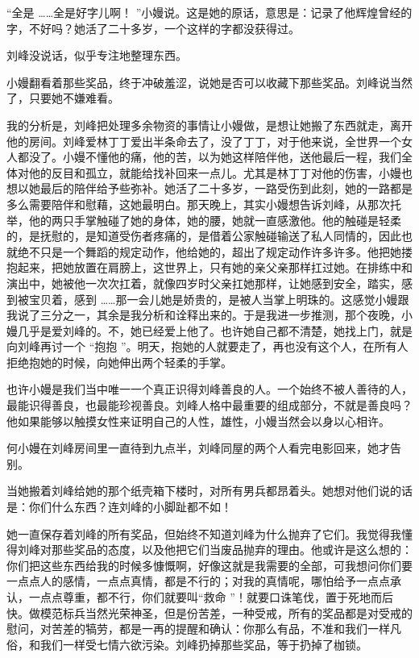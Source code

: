 \documentclass[12pt,twoside,openany]{book}
\begin{document}
“全是 ……全是好字儿啊！ ”小嫚说。这是她的原话，意思是：记录了他辉煌曾经的字，不好吗？她活了二十多岁，一个这样的字都没获得过。

刘峰没说话，似乎专注地整理东西。

小嫚翻看着那些奖品，终于冲破羞涩，说她是否可以收藏下那些奖品。刘峰说当然了，只要她不嫌难看。

我的分析是，刘峰把处理多余物资的事情让小嫚做，是想让她搬了东西就走，离开他的房间。刘峰爱林丁丁爱出半条命去了，没了丁丁，对于他来说，全世界一个女人都没了。小嫚不懂他的痛，他的苦，以为她这样陪伴他，送他最后一程，我们全体对他的反目和孤立，就能给找补回来一点儿。尤其是林丁丁对他的伤害，小嫚也想以她最后的陪伴给予些弥补。她活了二十多岁，一路受伤到此刻，她的一路都是多么需要陪伴和慰藉，这她最明白。那天晚上，其实小嫚想告诉刘峰，从那次托举，他的两只手掌触碰了她的身体，她的腰，她就一直感激他。他的触碰是轻柔的，是抚慰的，是知道受伤者疼痛的，是借着公家触碰输送了私人同情的，因此也就绝不只是一个舞蹈的规定动作，他给她的，超出了规定动作许多许多。他把她搂抱起来，把她放置在肩膀上，这世界上，只有她的亲父亲那样扛过她。在排练中和演出中，她被他一次次扛着，就像四岁时父亲扛她那样，让她感到安全，踏实，感到被宝贝着，感到 ……那一会儿她是娇贵的，是被人当掌上明珠的。这感觉小嫚跟我说了三分之一，其余是我分析和诠释出来的。于是我进一步推测，那个夜晚，小嫚几乎是爱刘峰的。不，她已经爱上他了。也许她自己都不清楚，她找上门，就是向刘峰再讨一个 “抱抱 ”。明天，抱她的人就要走了，再也没有这个人，在所有人拒绝抱她的时候，向她伸出两个轻柔的手掌。

也许小嫚是我们当中唯一一个真正识得刘峰善良的人。一个始终不被人善待的人，最能识得善良，也最能珍视善良。刘峰人格中最重要的组成部分，不就是善良吗？他如果能够以触摸女性来证明自己的人性，雄性，小嫚当然会以身以心相许。

何小嫚在刘峰房间里一直待到九点半，刘峰同屋的两个人看完电影回来，她才告别。

当她搬着刘峰给她的那个纸壳箱下楼时，对所有男兵都昂着头。她想对他们说的话是：你们什么东西？连刘峰的小脚趾都不如！

她一直保存着刘峰的所有奖品，但始终不知道刘峰为什么抛弃了它们。我觉得我懂得刘峰对那些奖品的态度，以及他把它们当废品抛弃的理由。他或许是这么想的：你们把这些东西给我的时候多慷慨啊，好像这就是我需要的全部，可我想问你们要一点点人的感情，一点点真情，都是不行的；对我的真情呢，哪怕给予一点点承认，一点点尊重，都不行，你们就要叫“救命 ”！就要口诛笔伐，置于死地而后快。做模范标兵当然光荣神圣，但是份苦差，一种受戒，所有的奖品都是对受戒的慰问，对苦差的犒劳，都是一再的提醒和确认：你那么有品，不准和我们一样凡俗，和我们一样受七情六欲污染。刘峰扔掉那些奖品，等于扔掉了枷锁。
\end{document}
